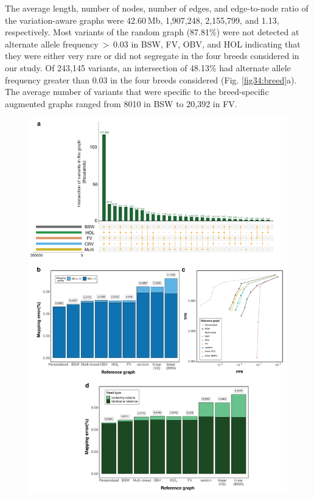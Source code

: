 \documentclass[../main.tex]{subfiles}
\begin{document}
The average length, number of nodes, number of edges, and edge-to-node ratio of the variation-aware graphs were 42.60 Mb, 1,907,248, 2,155,799, and 1.13, respectively. Most variants of the random graph (87.81\%) were not detected at alternate allele frequency $>$ 0.03 in BSW, FV, OBV, and HOL indicating that they were either very rare or did not segregate in the four breeds considered in our study. Of 243,145 variants, an intersection of 48.13\% had alternate allele frequency greater than 0.03 in the four breeds considered (Fig. \ref{fig34:breed}a). The average number of variants that were specific to the breed-specific augmented graphs ranged from 8010 in BSW to 20,392 in FV.

\begin{figure}[!htb]
    \centering
    \includegraphics[width=\textwidth]{paper2/main_figure/Fig4.pdf}
\end{figure}
\end{document}
